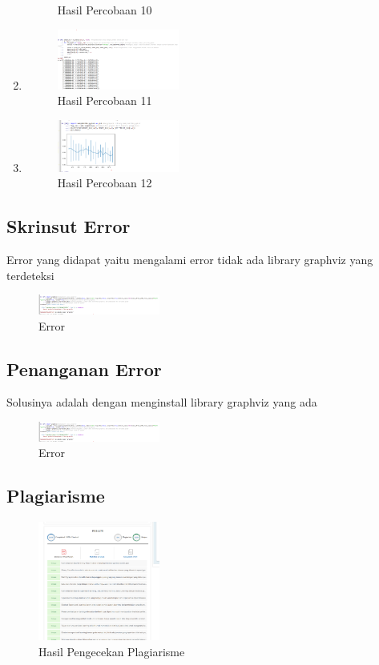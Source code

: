 \begin{enumerate}
\begin{figure}[H]
		\centering
		\caption{Hasil Percobaan 10}
    \end{figure}
    \item \hfill \break 
	\begin{figure}[H]
		\includegraphics[width=4cm]{figures/1174035/chapter2/11.png}
		\centering
		\caption{Hasil Percobaan 11}
    \end{figure}
    \item \hfill \break 
	\begin{figure}[H]
		\includegraphics[width=4cm]{figures/1174035/chapter2/12.png}
		\centering
		\caption{Hasil Percobaan 12}
	\end{figure}
\end{enumerate}
\subsection{Skrinsut Error}
Error yang didapat yaitu mengalami error tidak ada library graphviz yang terdeteksi
\begin{figure}[H]
    \includegraphics[width=4cm]{figures/1174035/chapter2/error.png}
    \centering
    \caption{Error}
\end{figure}
\subsection{Penanganan Error}
Solusinya adalah dengan menginstall library graphviz yang ada
\begin{figure}[H]
    \includegraphics[width=4cm]{figures/1174035/chapter2/error.png}
    \centering
    \caption{Error}
\end{figure}
\subsection{Plagiarisme}
\begin{figure}[H]
    \includegraphics[width=4cm]{figures/1174035/chapter2/plagiarism.png}
    \centering
    \caption{Hasil Pengecekan Plagiarisme}
\end{figure}
